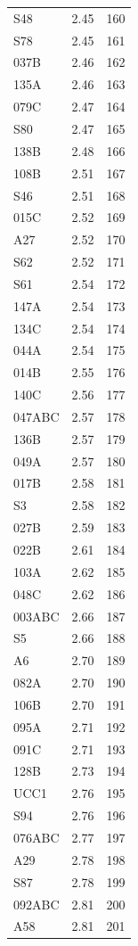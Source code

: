 \begin{longtable}{lrr}
  S48 & 2.45 & 160 \\
  S78 & 2.45 & 161 \\
  037B & 2.46 & 162 \\
  135A & 2.46 & 163 \\
  079C & 2.47 & 164 \\
  S80 & 2.47 & 165 \\
  138B & 2.48 & 166 \\
  108B & 2.51 & 167 \\
  S46 & 2.51 & 168 \\
  015C & 2.52 & 169 \\
  A27 & 2.52 & 170 \\
  S62 & 2.52 & 171 \\
  S61 & 2.54 & 172 \\
  147A & 2.54 & 173 \\
  134C & 2.54 & 174 \\
  044A & 2.54 & 175 \\
  014B & 2.55 & 176 \\
  140C & 2.56 & 177 \\
  047ABC & 2.57 & 178 \\
  136B & 2.57 & 179 \\
  049A & 2.57 & 180 \\
  017B & 2.58 & 181 \\
  S3 & 2.58 & 182 \\
  027B & 2.59 & 183 \\
  022B & 2.61 & 184 \\
  103A & 2.62 & 185 \\
  048C & 2.62 & 186 \\
  003ABC & 2.66 & 187 \\
  S5 & 2.66 & 188 \\
  A6 & 2.70 & 189 \\
  082A & 2.70 & 190 \\
  106B & 2.70 & 191 \\
  095A & 2.71 & 192 \\
  091C & 2.71 & 193 \\
  128B & 2.73 & 194 \\
  UCC1 & 2.76 & 195 \\
  S94 & 2.76 & 196 \\
  076ABC & 2.77 & 197 \\
  A29 & 2.78 & 198 \\
  S87 & 2.78 & 199 \\
  092ABC & 2.81 & 200 \\
  A58 & 2.81 & 201 \\

\end{longtable}
